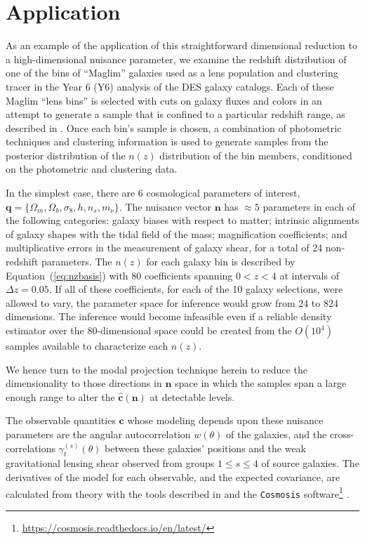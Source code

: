 \documentclass[onecolumn]{aastex7}
\newcommand{\eqq}[1]{Equation~(\ref{#1})}
\newcommand{\vecc}{\ensuremath{\mathbf{c}}}
\newcommand{\vecq}{\ensuremath{\mathbf{q}}}
\newcommand{\vecn}{\ensuremath{\mathbf{n}}}
\newcommand{\hatc}{\ensuremath{\hat{\mathbf{c}}}}
\begin{document}
\section{Application}\label{sec:app}
As an example of the application of this straightforward dimensional
reduction to a high-dimensional nuisance parameter, we examine the
redshift distribution of one of the bins of ``Maglim''  galaxies used
as a lens population and clustering tracer in the Year 6 (Y6) analysis of
the DES galaxy catalogs.  Each of these Maglim ``lens bins''
is selected with cuts on galaxy fluxes and
colors in an attempt to generate a sample that is confined to a
particular redshift range, as described in \citet{y6maglim}.  Once each bin's
sample is chosen, a combination of 
photometric techniques \citep{y6lenspz,y6pz} and clustering information
\citep{y6wz} is used to generate samples from the posterior
distribution of  the $n(z)$ distribution of the bin members, conditioned
on the photometric and clustering data.

In the simplest case,
there are 6 cosmological parameters of interest, $\vecq = \{\Omega_m,
\Omega_b, \sigma_8, h, n_s, m_\nu\}.$   The nuisance vector $\vecn$
has $\approx 5$  parameters in each of the following categories: galaxy
biases with respect to matter; intrinsic alignments of galaxy shapes
with the tidal field of the mass; magnification coefficients; and multiplicative errors in the
measurement of galaxy shear, for a total of 24 non-redshift parameters.  The $n(z)$ for each galaxy bin
is
described by \eqq{eq:nzbasis} with 80 coefficients spanning $0<z<4$ at
intervals of $\Delta z=0.05.$ If all of these coefficients, for each
of the 10 galaxy selections, were allowed to vary, the parameter space for inference would grow from 24 to 824 dimensions.
The inference would become infeasible even if a
reliable density estimator over the 80-dimensional space could be
created from the $O(10^4)$ samples available to characterize each
$n(z).$ 

We hence turn to the modal projection technique herein to reduce the
dimensionality to those directions in $\vecn$ space in which the samples span a large
enough range to alter the $\hatc(\vecn)$ at detectable levels. 

The observable quantities $\vecc$ whose modeling depends upon these nuisance
parameters are the angular autocorrelation $w(\theta)$ of the 
galaxies, and the cross-correlations $\gamma_t^{(s)}(\theta)$ between
these galaxies' positions and the weak gravitational lensing shear
observed from groups $1\le s \le 4$ of source galaxies.  The
derivatives of the model for each observable, and the expected
covariance, are calculated from theory with the tools described in
\citet{y6model} and the \texttt{Cosmosis} software\footnote{\url{https://cosmosis.readthedocs.io/en/latest/}} \citep{cosmosis}.
\end{document}
